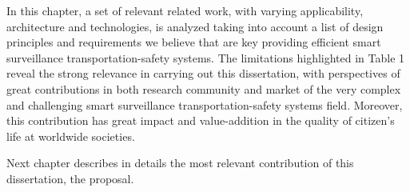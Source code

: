 In this chapter, a set of relevant related work, with varying applicability, architecture and technologies, is analyzed taking into account a list of design principles and requirements we believe that are key providing efficient smart surveillance transportation-safety systems. The limitations  highlighted in Table 1 reveal the strong relevance in carrying out this dissertation, with perspectives  of great contributions in both research community and market of the very complex and challenging smart surveillance transportation-safety systems field. Moreover, this contribution has great impact and value-addition in the quality of citizen's life at worldwide societies.

Next chapter describes in details the most relevant contribution of this dissertation, the proposal. 